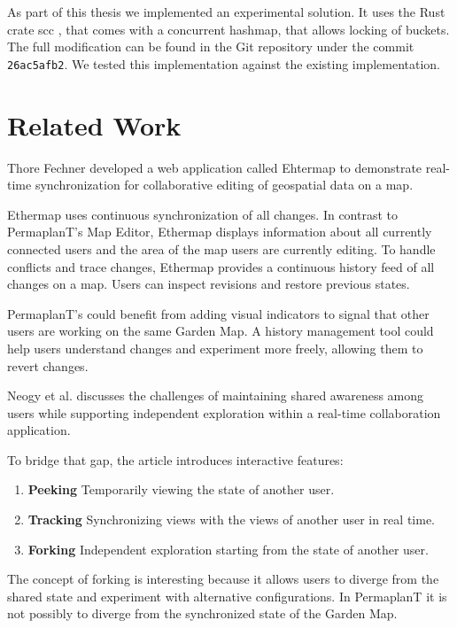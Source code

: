 \documentclass[final,oneside]{vutinfth}
\begin{document}
As part of this thesis we implemented an experimental solution.
It uses the Rust crate scc \cite{scccrate}, that comes with a concurrent hashmap, that allows locking of buckets.
The full modification can be found in the Git repository under the commit \texttt{26ac5afb2}.
We tested this implementation against the existing implementation.

\chapter{Related Work}
\label{related_work}

Thore Fechner developed a web application called Ehtermap to demonstrate real-time synchronization for collaborative editing of geospatial data on a map\cite{ethermap}.

Ethermap uses continuous synchronization of all changes.
In contrast to PermaplanT's Map Editor, Ethermap displays information about all currently connected users and the area of the map users are currently editing.
To handle conflicts and trace changes, Ethermap provides a continuous history feed of all changes on a map.
Users can inspect revisions and restore previous states.

PermaplanT's could benefit from adding visual indicators to signal that other users are working on the same Garden Map.
A history management tool could help users understand changes and experiment more freely, allowing them to revert changes.

Neogy et al. discusses the challenges of maintaining shared awareness among users while supporting independent exploration within a real-time collaboration application. \cite{collaboration_visualizations} 

To bridge that gap, the article introduces interactive features:
\begin{enumerate}
    \item \textbf{Peeking} Temporarily viewing the state of another user.
    \item \textbf{Tracking} Synchronizing views with the views of another user in real time.
    \item \textbf{Forking} Independent exploration starting from the state of another user.
\end{enumerate}

The concept of forking is interesting because it allows users to diverge from the shared state and experiment with alternative configurations.
In PermaplanT it is not possibly to diverge from the synchronized state of the Garden Map.
\end{document}
